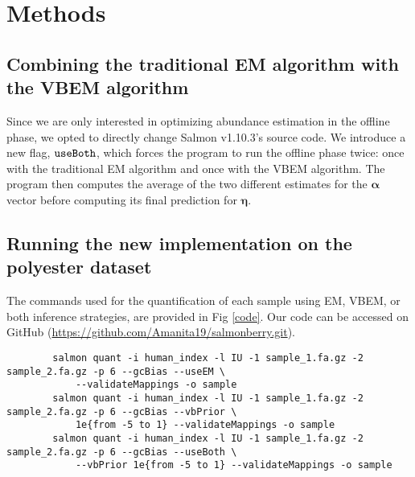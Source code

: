 \section{Methods}
\subsection{Combining the traditional EM algorithm with the VBEM algorithm}
Since we are only interested in optimizing abundance estimation in the offline phase, we opted to directly change Salmon v1.10.3’s 
source code. We introduce a new flag, $\mathtt{\-\-useBoth}$, which forces the program to run the offline phase twice: 
once with the traditional EM algorithm and once with the VBEM algorithm. 
The program then computes the average of the two different estimates for the $\pmb{\alpha}$ vector before computing its final 
prediction for $\pmb{\eta}$.

\subsection{Running the new implementation on the polyester dataset}
The commands used for the quantification of each sample using EM, VBEM, or both inference strategies, are provided in Fig \ref{code}. Our code can be accessed on GitHub (\href{https://github.com/Amanita19/salmonberry.git}{https://github.com/Amanita19/salmonberry.git}).%
\begin{figure*}[!t]
    \centering
    {        
        \begin{verbatim}
        salmon quant -i human_index -l IU -1 sample_1.fa.gz -2 sample_2.fa.gz -p 6 --gcBias --useEM \
            --validateMappings -o sample
        salmon quant -i human_index -l IU -1 sample_1.fa.gz -2 sample_2.fa.gz -p 6 --gcBias --vbPrior \
            1e{from -5 to 1} --validateMappings -o sample
        salmon quant -i human_index -l IU -1 sample_1.fa.gz -2 sample_2.fa.gz -p 6 --gcBias --useBoth \
            --vbPrior 1e{from -5 to 1} --validateMappings -o sample
    \end{verbatim}
    }
    \caption{Commands used for the quantification of each sample using EM, VBEM, or both inference strategies, respectively.}
    \label{code}
\end{figure*}

